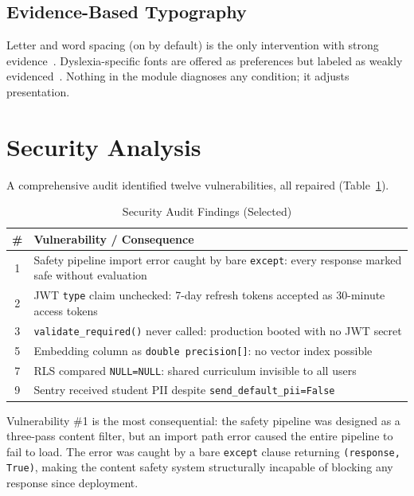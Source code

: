 \documentclass[conference]{IEEEtran}
\begin{document}
\subsection{Evidence-Based Typography}
Letter and word spacing (on by default) is the only intervention with strong evidence~\cite{b13}. Dyslexia-specific fonts are offered as preferences but labeled as weakly evidenced~\cite{b14,b15}. Nothing in the module diagnoses any condition; it adjusts presentation.

\section{Security Analysis}

A comprehensive audit identified twelve vulnerabilities, all repaired (Table~\ref{tab:security}).

\begin{table}[htbp]
\caption{Security Audit Findings (Selected)}
\label{tab:security}
\centering
\begin{tabular}{@{}cp{5.5cm}@{}}
\toprule
\textbf{\#} & \textbf{Vulnerability / Consequence} \\
\midrule
1 & Safety pipeline import error caught by bare \texttt{except}: every response marked safe without evaluation \\
2 & JWT \texttt{type} claim unchecked: 7-day refresh tokens accepted as 30-minute access tokens \\
3 & \texttt{validate\_required()} never called: production booted with no JWT secret \\
5 & Embedding column as \texttt{double precision[]}: no vector index possible \\
7 & RLS compared \texttt{NULL=NULL}: shared curriculum invisible to all users \\
9 & Sentry received student PII despite \texttt{send\_default\_pii=False} \\
\bottomrule
\end{tabular}
\end{table}

Vulnerability \#1 is the most consequential: the safety pipeline was designed as a three-pass content filter, but an import path error caused the entire pipeline to fail to load. The error was caught by a bare \texttt{except} clause returning \texttt{(response, True)}, making the content safety system structurally incapable of blocking any response since deployment.
\end{document}
